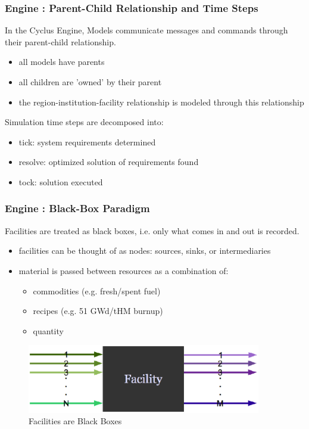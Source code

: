 \begin{frame}[ctb!]
  \frametitle{Engine : Parent-Child Relationship and Time Steps}
  In the Cyclus Engine, Models communicate messages and commands through their 
  parent-child relationship.
  \begin{itemize}
    \item all models have parents
    \item all children are 'owned' by their parent
    \item the region-institution-facility relationship is modeled through this relationship
  \end{itemize}
  Simulation time steps are decomposed into:
  \begin{itemize}
    \item tick: system requirements determined
    \item resolve: optimized solution of requirements found
    \item tock: solution executed
  \end{itemize}
\end{frame}

\begin{frame}[ctb!]
  \frametitle{Engine : Black-Box Paradigm}
  Facilities are treated as black boxes, i.e. only what comes in and
  out is recorded.
  \begin{itemize}
    \item facilities can be thought of as nodes: sources, sinks, or intermediaries
    \item material is passed between resources as a combination of:
      \begin{itemize}
        \item commodities (e.g. fresh/spent fuel)
        \item recipes (e.g. 51 GWd/tHM burnup)
        \item quantity
      \end{itemize}
  \end{itemize}
  \begin{figure}[htbp!]
    \begin{center}
      \includegraphics[height=3cm]{facility.eps}
    \end{center}
    \caption{Facilities are Black Boxes} 
    \label{fig:facility}
  \end{figure}
\end{frame}
